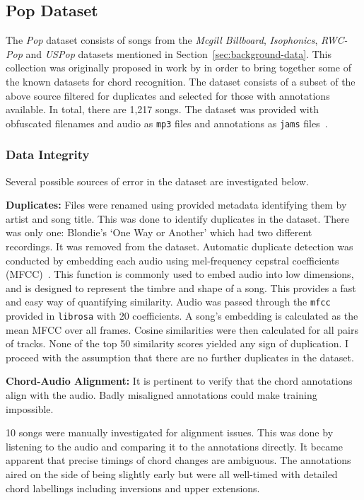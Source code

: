 \subsection{Pop Dataset}

The \emph{Pop} dataset consists of songs from the \emph{Mcgill Billboard}, \emph{Isophonics}, \emph{RWC-Pop} and \emph{USPop} datasets mentioned in Section~\ref{sec:background-data}. This collection was originally proposed in work by \citet{FourTimelyInsights} in order to bring together some of the known datasets for chord recognition. The dataset consists of a subset of the above source filtered for duplicates and selected for those with annotations available. In total, there are 1,217 songs. The dataset was provided with obfuscated filenames and audio as \texttt{mp3} files and annotations as \texttt{jams} files~\citep{JAMS}. 

\subsubsection{Data Integrity}\label{sec:data-integrity}

Several possible sources of error in the dataset are investigated below.

\textbf{Duplicates:} Files were renamed using provided metadata identifying them by artist and song title. This was done to identify duplicates in the dataset. There was only one: Blondie's `One Way or Another' which had two different recordings. It was removed from the dataset. Automatic duplicate detection was conducted by embedding each audio using mel-frequency cepstral coefficients (MFCC)~\citep{MFCC}. This function is commonly used to embed audio into low dimensions, and is designed to represent the timbre and shape of a song. This provides a fast and easy way of quantifying similarity. Audio was passed through the \texttt{mfcc} provided in \texttt{librosa} with 20 coefficients. A song's embedding is calculated as the mean MFCC over all frames. Cosine similarities were then calculated for all pairs of tracks. None of the top 50 similarity scores yielded any sign of duplication. I proceed with the assumption that there are no further duplicates in the dataset.

\textbf{Chord-Audio Alignment:} It is pertinent to verify that the chord annotations align with the audio. Badly misaligned annotations could make training impossible.

10 songs were manually investigated for alignment issues. This was done by listening to the audio and comparing it to the annotations directly. It became apparent that precise timings of chord changes are ambiguous. The annotations aired on the side of being slightly early but were all well-timed with detailed chord labellings including inversions and upper extensions.

